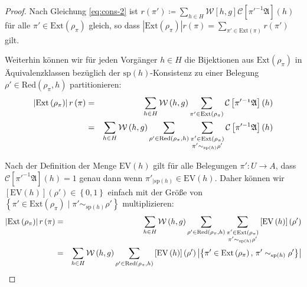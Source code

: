 \begin{proof}
Nach Gleichung \ref{eq:cons-2} ist $r\left(\pi'\right)\coloneqq\sum_{h\in H}\mathcal{W}\left[h,g\right]\mathcal{C}\left[\pi'^{-1}\mathfrak{A}\right]\left(h\right)$
für alle $\pi'\in\mathrm{Ext}\left(\rho_{\pi}\right)$ gleich, so
dass $\left|\mathrm{Ext}\left(\rho_{\pi}\right)\right|r\left(\pi\right)=\sum_{\pi'\in\mathrm{Ext}\left(\pi\right)}r\left(\pi'\right)$
gilt.

Weiterhin können wir für jeden Vorgänger $h\in H$ die Bijektionen
aus $\mathrm{Ext}\left(\rho_{\pi}\right)$ in Äquivalenzklassen bezüglich
der $\mathrm{sp}\left(h\right)$-Konsistenz zu einer Belegung $\rho'\in\mathrm{Red}\left(\rho_{\pi},h\right)$
partitionieren: 
\begin{eqnarray*}
\left|\mathrm{Ext}\left(\rho_{\pi}\right)\right|r\left(\pi\right) & = & \sum_{h\in H}\mathcal{W}\left(h,g\right)\sum_{\pi'\in\mathrm{Ext}\left(\rho_{\pi}\right)}\mathcal{C}\left[\pi'\mathfrak{^{-1}A}\right]\left(h\right)\\
 & = & \sum_{h\in H}\mathcal{W}\left(h,g\right)\sum_{\rho'\in\mathrm{Red}\left(\rho_{\pi},h\right)}\sum_{\begin{subarray}{c}
\pi'\in\mathrm{Ext}\left(\rho_{\pi}\right)\\
\pi'\sim_{\mathrm{sp}\left(h\right)}\rho'
\end{subarray}}\mathcal{C}\left[\pi'^{-1}\mathfrak{A}\right]\left(h\right)
\end{eqnarray*}

Nach der Definition der Menge $\mathrm{EV}\left(h\right)$ gilt für
alle Belegungen $\pi':U\rightarrow A$, dass $\mathcal{C}\left[\pi'^{-1}\mathfrak{A}\right]\left(h\right)=1$
genau dann wenn $\pi'_{\mid\mathrm{sp}\left(h\right)}\in\mathrm{EV}\left(h\right)$.
Daher können wir $\left[\mathrm{EV}\left(h\right)\right]\left(\rho'\right)\in\left\{ 0,1\right\} $
einfach mit der Größe von $\left\{ \pi'\in\mathrm{Ext}\left(\rho_{\pi}\right)\mid\pi'\sim_{\mathrm{sp}\left(h\right)}\rho'\right\} $
multiplizieren: 
\begin{eqnarray*}
\left|\mathrm{Ext}\left(\rho_{\pi}\right)\right|r\left(\pi\right) & = & \sum_{h\in H}\mathcal{W}\left(h,g\right)\sum_{\rho'\in\mathrm{Red}\left(\rho_{\pi},h\right)}\sum_{\begin{subarray}{c}
\pi'\in\mathrm{Ext}\left(\rho_{\pi}\right)\\
\pi'\sim_{\mathrm{sp}\left(h\right)}\rho'
\end{subarray}}\left[\mathrm{EV}\left(h\right)\right]\left(\rho'\right)\\
 & = & \sum_{h\in H}\mathcal{W}\left(h,g\right)\sum_{\rho'\in\mathrm{Red}\left(\rho_{\pi},h\right)}\left[\mathrm{EV}\left(h\right)\right]\left(\rho'\right)\left|\left\{ \pi'\in\mathrm{Ext}\left(\rho_{\pi}\right),\,\pi'\sim_{\mathrm{sp}\left(h\right)}\rho'\right\} \right|
\end{eqnarray*}


\end{proof}
